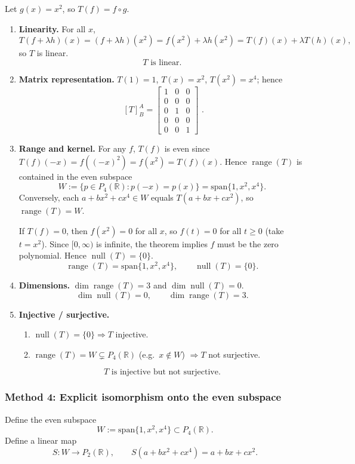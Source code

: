 \documentclass[12pt]{article}
\let\amsboxed\boxed
\renewcommand{\boxed}[1]{\amsboxed{\,#1\,}}
\begin{document}
Let $g(x)=x^2$, so $T(f)=f\circ g$.

\begin{enumerate}[label=(\alph*)]
\item \textbf{Linearity.}
For all $x$,
\[
T(f+\lambda h)(x)=(f+\lambda h)(x^2)=f(x^2)+\lambda h(x^2)=T(f)(x)+\lambda T(h)(x),
\]
so $T$ is linear.
\[
\boxed{\,T\text{ is linear.}\,}
\]

\item \textbf{Matrix representation.}
$T(1)=1$, $T(x)=x^2$, $T(x^2)=x^4$; hence
\[
\boxed{\, [T]_{B}^{A}=
\begin{bmatrix}
1&0&0\\
0&0&0\\
0&1&0\\
0&0&0\\
0&0&1
\end{bmatrix}\,}.
\]

\item \textbf{Range and kernel.}
For any $f$, $T(f)$ is even since $T(f)(-x)=f((-x)^2)=f(x^2)=T(f)(x)$. Hence $\operatorname{range}(T)$ is contained in the even subspace
\[
W:=\{p\in P_4(\mathbb{R}): p(-x)=p(x)\}=\mathrm{span}\{1,x^2,x^4\}.
\]
Conversely, each $a+bx^2+cx^4\in W$ equals $T(a+bx+cx^2)$, so $\operatorname{range}(T)=W$.

If $T(f)=0$, then $f(x^2)=0$ for all $x$, so $f(t)=0$ for all $t\ge 0$ (take $t=x^2$). Since $[0,\infty)$ is infinite, the theorem implies $f$ must be the zero polynomial. Hence $\operatorname{null}(T)=\{0\}$.
\[
\boxed{\,\operatorname{range}(T)=\mathrm{span}\{1,x^2,x^4\},\qquad \operatorname{null}(T)=\{0\}.\,}
\]

\item \textbf{Dimensions.}
$\dim\operatorname{range}(T)=3$ and $\dim\operatorname{null}(T)=0$.
\[
\boxed{\,\dim\operatorname{null}(T)=0,\qquad \dim\operatorname{range}(T)=3.\,}
\]

\item \textbf{Injective / surjective.}
\begin{enumerate}[label=(\roman*)]
\item $\operatorname{null}(T)=\{0\}\Rightarrow T$ injective.
\item $\operatorname{range}(T)=W\subsetneq P_4(\mathbb{R})$ (e.g.\ $x\notin W$) $\Rightarrow T$ not surjective.
\end{enumerate}
\[
\boxed{\,T\text{ is injective but not surjective.}\,}
\]
\end{enumerate}
\newpage
\subsubsection{Method 4: Explicit isomorphism onto the even subspace}
Define the even subspace
\[
W:=\mathrm{span}\{1,x^2,x^4\}\subset P_4(\mathbb{R}).
\]
Define a linear map
\[
S:W\to P_2(\mathbb{R}),\qquad S(a+bx^2+cx^4)=a+bx+cx^2.
\]
\end{document}
